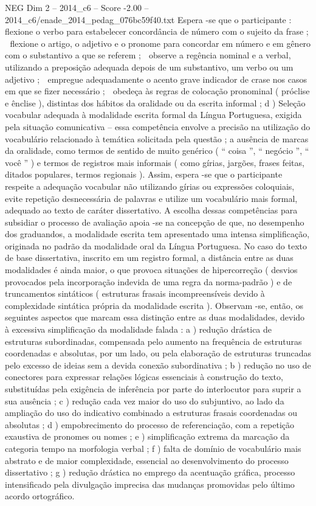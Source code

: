 \begin{textsample}{NEG Dim 2 – 2014\_c6 – Score -2.00 – 2014\_c6/enade\_2014\_pedag\_076bc59f40.txt}
Espera -se que o participante :  flexione o verbo para estabelecer concordância de número com o sujeito da frase ;  flexione o artigo, o adjetivo e o pronome para concordar em número e em gênero com o substantivo a que se referem ;  observe a regência nominal e a verbal, utilizando a preposição adequada depois de um substantivo, um verbo ou um adjetivo ;  empregue adequadamente o acento grave indicador de crase nos casos em que se fizer necessário ;  obedeça às regras de colocação pronominal ( próclise e ênclise ), distintas dos hábitos da oralidade ou da escrita informal ; d ) Seleção vocabular adequada à modalidade escrita formal da Língua Portuguesa, exigida pela situação comunicativa – essa competência envolve a precisão na utilização do vocabulário relacionado à temática solicitada pela questão ; a ausência de marcas da oralidade, como termos de sentido de muito genérico ( “ coisa ”, “ negócio ”, “ você ” ) e termos de registros mais informais ( como gírias, jargões, frases feitas, ditados populares, termos regionais ).
Assim, espera -se que o participante respeite a adequação vocabular não utilizando gírias ou expressões coloquiais, evite repetição desnecessária de palavras e utilize um vocabulário mais formal, adequado ao texto de caráter dissertativo.
A escolha dessas competências para subsidiar o processo de avaliação apoia -se na concepção de que, no desempenho dos graduandos, a modalidade escrita tem apresentado uma intensa simplificação, originada no padrão da modalidade oral da Língua Portuguesa.
No caso do texto de base dissertativa, inscrito em um registro formal, a distância entre as duas modalidades é ainda maior, o que provoca situações de hipercorreção ( desvios provocados pela incorporação indevida de uma regra da norma-padrão ) e de truncamentos sintáticos ( estruturas frasais incompreensíveis devido à complexidade sintática própria da modalidade escrita ).
Observam -se, então, os seguintes aspectos que marcam essa distinção entre as duas modalidades, devido à excessiva simplificação da modalidade falada : a ) redução drástica de estruturas subordinadas, compensada pelo aumento na frequência de estruturas coordenadas e absolutas, por um lado, ou pela elaboração de estruturas truncadas pelo excesso de ideias sem a devida conexão subordinativa ; b ) redução no uso de conectores para expressar relações lógicas essenciais à construção do texto, substituídas pela exigência de inferência por parte do interlocutor para suprir a sua ausência ; c ) redução cada vez maior do uso do subjuntivo, ao lado da ampliação do uso do indicativo combinado a estruturas frasais coordenadas ou absolutas ; d ) empobrecimento do processo de referenciação, com a repetição exaustiva de pronomes ou nomes ; e ) simplificação extrema da marcação da categoria tempo na morfologia verbal ; f ) falta de domínio de vocabulário mais abstrato e de maior complexidade, essencial ao desenvolvimento do processo dissertativo ; g ) redução drástica no emprego da acentuação gráfica, processo intensificado pela divulgação imprecisa das mudanças promovidas pelo último acordo ortográfico.

\end{textsample}
